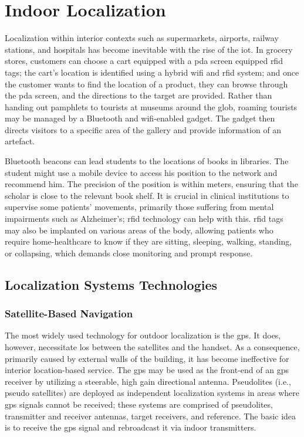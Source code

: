 \chapter{Indoor Localization}

Localization within interior contexts such as supermarkets, airports, railway stations, and hospitals has become inevitable with the rise of the \ac{iot}.
In grocery stores, customers can choose a cart equipped with a \ac{pda} screen equipped \ac{rfid} tags;
the cart's location is identified using a hybrid \ac{wifi} and \ac{rfid} system;
and once the customer wants to find the location of a product, they can browse through the \ac{pda} screen, and the directions to the target are provided\cite{kourouthanassis2001last}.
Rather than handing out pamphlets to tourists at museums around the glob, roaming tourists may be managed by a Bluetooth and \ac{wifi}-enabled gadget.
The gadget then directs visitors to a specific area of the gallery and provide information of an artefact.


Bluetooth beacons can lead students to the locations of books in libraries.
The student might use a mobile device to access his position to the network and recommend him.
The precision of the position is within meters, ensuring that the scholar is close to the relevant book shelf\cite{hahn2017indoor}.
It is crucial in clinical institutions to supervise some patients' movements, primarily those suffering from mental impairments such as Alzheimer's; \ac{rfid} technology can help with this\cite{calderoni2015indoor}.
\Ac{rfid} tags may also be implanted on various areas of the body, allowing patients who require home-healthcare to know if they are sitting, sleeping, walking, standing, or collapsing, which demands close monitoring and prompt response\cite{shuaieb2020rfid}.

\section{Localization Systems Technologies}

\subsection{Satellite-Based Navigation}
The most widely used technology for outdoor localization is the \ac{gps}.
It does, however, necessitate \acf{los} between the satellites and the handset.
As a consequence, primarily caused by external walls of the building, it has become ineffective for interior location-based service.
The \ac{gps} may be used as the front-end of an \ac{gps} receiver by utilizing a steerable, high gain directional antenna.
Pseudolites (i.e., pseudo satellites) are deployed as independent localization systems in areas where \ac{gps} signals cannot be received;
these systems are comprised of pseudolites, transmitter and receiver antennas, target receivers, and reference.
The basic idea is to receive the \ac{gps} signal and rebroadcast it via indoor transmitters\cite{xu2015new}.

